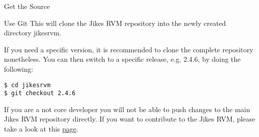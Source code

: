 \begin{chapter}{Get the Source}
\begin{section}{Use Git}
This will clone the Jikes RVM repository into the newly created directory jikesrvm.

If you need a specific version, it is recommended to clone the complete repository nonetheless. You can then switch to a specific release, e.g. 2.4.6, by doing the following:

\begin{lstlisting}
$ cd jikesrvm
$ git checkout 2.4.6
\end{lstlisting}

If you are a not core developer you will not be able to push changes to the main Jikes RVM repository directly. If you want to contribute to the Jikes RVM, please take a look at this \href{http://www.jikesrvm.org/Contributions/}{page}.

\end{section}

\end{chapter}
